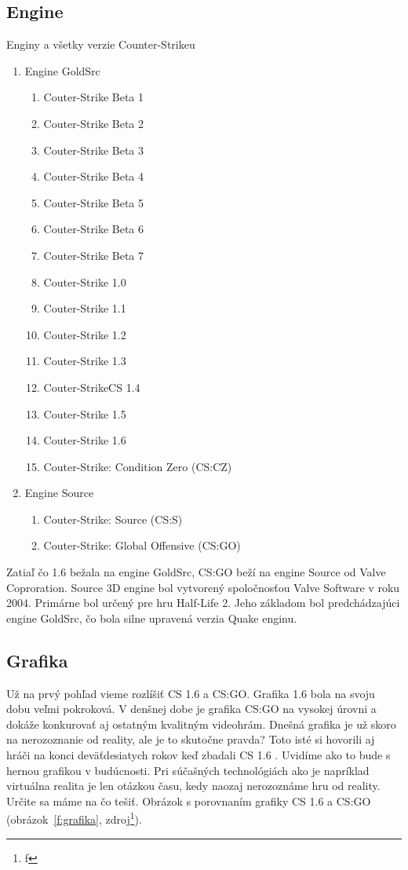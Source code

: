 \documentclass[10pt,oneside,slovak,a4paper]{article}
\begin{document}
\subsection{Engine} \label{porovnanie:engine}

Enginy a všetky verzie Counter-Strikeu
\begin{enumerate}
\item Engine GoldSrc
	\begin{enumerate}
	\item Couter-Strike Beta 1
	\item Couter-Strike Beta 2
	\item Couter-Strike Beta 3
	\item Couter-Strike Beta 4
	\item Couter-Strike Beta 5
	\item Couter-Strike Beta 6
	\item Couter-Strike Beta 7
	\item Couter-Strike 1.0
	\item Couter-Strike 1.1
	\item Couter-Strike 1.2
	\item Couter-Strike 1.3
	\item Couter-StrikeCS 1.4
	\item Couter-Strike 1.5
	\item Couter-Strike 1.6
	\item Couter-Strike: Condition Zero (CS:CZ)
	\end{enumerate}
\item Engine Source
	\begin{enumerate}
	\item Couter-Strike: Source (CS:S)
	\item Couter-Strike: Global Offensive (CS:GO)
	\end{enumerate}
\end{enumerate}

Zatiaľ čo 1.6 bežala na engine GoldSrc, CS:GO beží na engine Source od Valve Coproration. Source 3D engine bol vytvorený spoločnosťou Valve Software v roku 2004. Primárne bol určený pre hru Half-Life 2. Jeho základom bol predchádzajúci engine GoldSrc, čo bola silne upravená verzia Quake enginu.

\subsection{Grafika} \label{porovnanie:grafika}

Už na prvý pohľad vieme rozlíšiť CS 1.6 a CS:GO. Grafika 1.6 bola na svoju dobu veľmi pokroková. V denšnej dobe je grafika  CS:GO na vysokej úrovni a dokáže konkurovať aj ostatným kvalitným videohrám. Dnešná grafika je už skoro na nerozoznanie od reality, ale je to skutočne pravda? Toto isté si hovorili aj hráči na konci deväťdesiatych rokov keď zbadali CS 1.6 . Uvidíme ako to bude s hernou grafikou v budúcnosti. Pri súčašných technológiách ako je napríklad virtuálna realita je len otázkou času, kedy naozaj nerozoznáme hru od reality. Určite sa máme na čo tešiť. Obrázok s porovnaním grafiky CS 1.6 a CS:GO (obrázok~\ref{f:grafika}, zdroj\footnote{f}).
\end{document}
